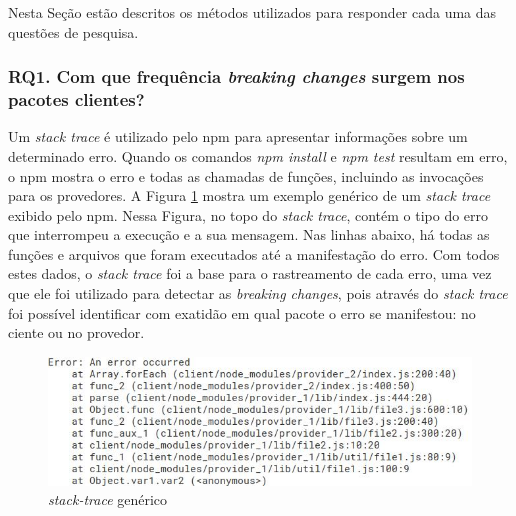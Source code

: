 Nesta Seção estão descritos os métodos utilizados para responder cada uma das questões de pesquisa.

\subsubsection{RQ1. Com que frequência \textit{breaking changes} surgem  nos pacotes clientes?}
\label{apr:rq1}

Um \textit{stack trace} é utilizado pelo \gls{npm} para apresentar informações sobre um determinado erro. Quando os comandos \textit{npm install} e \textit{npm test} resultam em erro, o \gls{npm} mostra o erro e todas as chamadas de funções, incluindo as invocações para os provedores. A Figura \ref{fig:trace} mostra um exemplo genérico de um \textit{stack trace} exibido pelo \gls{npm}. Nessa Figura, no topo do \textit{stack trace}, contém o tipo do erro que interrompeu a execução  e a sua mensagem. Nas linhas abaixo, há todas as funções e arquivos que foram executados até a manifestação do erro. Com todos estes dados, o \textit{stack trace} foi a base para o rastreamento de cada erro, uma vez que ele foi utilizado para detectar as \textit{breaking changes}, pois através do \textit{stack trace} foi possível identificar com exatidão em qual pacote o erro se manifestou: no ciente ou no provedor.

\begin{figure}
    \centering
    \includegraphics[scale=0.7]{figuras/stack_trace.jpeg}
    \caption{\textit{stack-trace} genérico}
    \label{fig:trace}
\end{figure}{}

